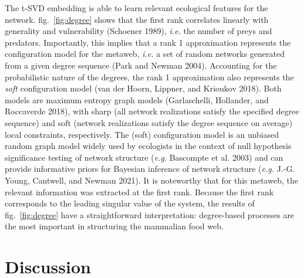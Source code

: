 \documentclass[10pt,oneside]{article}
\begin{document}
The t-SVD embedding is able to learn relevant ecological features for
the network. fig.~\ref{fig:degree} shows that the first rank correlates
linearly with generality and vulnerability (Schoener 1989), \emph{i.e.}
the number of preys and predators. Importantly, this implies that a rank
1 approximation represents the configuration model for the metaweb,
\emph{i.e.} a set of random networks generated from a given degree
sequence (Park and Newman 2004). Accounting for the probabilistic nature
of the degrees, the rank 1 approximation also represents the \emph{soft}
configuration model (van der Hoorn, Lippner, and Krioukov 2018). Both
models are maximum entropy graph models (Garlaschelli, Hollander, and
Roccaverde 2018), with sharp (all network realizations satisfy the
specified degree sequence) and soft (network realizations satisfy the
degree sequence on average) local constraints, respectively. The (soft)
configuration model is an unbiased random graph model widely used by
ecologists in the context of null hypothesis significance testing of
network structure (\emph{e.g.} Bascompte et al. 2003) and can provide
informative priors for Bayesian inference of network structure
(\emph{e.g.} J.-G. Young, Cantwell, and Newman 2021). It is noteworthy
that for this metaweb, the relevant information was extracted at the
first rank. Because the first rank corresponds to the leading singular
value of the system, the results of fig.~\ref{fig:degree} have a
straightforward interpretation: degree-based processes are the most
important in structuring the mammalian food web.

\hypertarget{discussion}{%
\section{Discussion}\label{discussion}}
\end{document}

